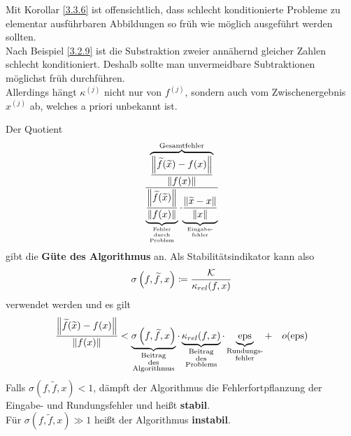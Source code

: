 \begin{Beme}
  Mit Korollar \ref{3.3.6} ist offensichtlich, dass schlecht konditionierte Probleme 
  zu elementar ausführbaren Abbildungen so früh wie möglich ausgeführt werden sollten. \\
  Nach Beispiel \ref{3.2.9} ist die Substraktion zweier annähernd gleicher Zahlen schlecht konditioniert.
  Deshalb sollte man unvermeidbare Subtraktionen möglichst früh durchführen. \\
  Allerdings hängt $\kappa^{(j)}$ nicht nur von $f^{(j)}$, sondern auch vom 
  Zwischenergebnis $x^{(j)}$ ab, welches a priori unbekannt ist.
\end{Beme}

\begin{Beme}[Sprechweise]\label{3.3.8}
  Der Quotient 
  \begin{gather}
    \frac{\overbrace{\frac{\left\| \widetilde{f}(\widetilde{x})-f(x) \right\|}{\left\| f(x) \right\|}}^{
        \text{Gesamtfehler}}}
    {\underbrace{\frac{\left\| \widetilde{f}(\widetilde{x}) \right\|}{\left\| f(x) \right\|}}_{
        \scriptsize\substack{
          \text{Fehler} \\
          \text{durch} \\
          \text{Problem}
        }}
      \cdot
      {\underbrace{\frac{\left\| \widetilde{x}-x \right\|}{\left\| x \right\|}}_{
          \scriptsize\substack{\text{Eingabe-} \\ \text{fehler}}}}}
    \label{III.3.6}
  \end{gather}
  gibt die \textbf{Güte des Algorithmus}  an.
  Als Stabilitätsindikator kann also 
  \begin{gather}
    \sigma\left(f, \widetilde{f}, x\right) \coloneqq \frac{\mathcal{K}}{\kappa_{rel}(f, x)}
    \label{III.3.7}
  \end{gather}
  verwendet werden und es gilt
  \begin{gather*}
    \frac{\left\| \widetilde{f}(\widetilde{x})-f(x) \right\|}{\left\| f(x) \right\|}
    < \underbrace{\sigma\left( f,\widetilde{f}, x\right) }_{
      \substack{\text{Beitrag}\\
        \text{des} \\
        \text{Algorithmus}}}
    \cdot \underbrace{\kappa_{rel}(f,x)}_{
      \substack{\text{Beitrag} \\
        \text{des} \\
        \text{Problems}}}
    \cdot \underbrace{\operatorname{eps}}_{\substack{\text{Rundungs-}\\\text{fehler}}}
    + \quad o(\operatorname{eps})
  \end{gather*}
  Falls $\sigma( f,\widetilde{f}, x)  < 1$, dämpft der Algorithmus die Fehlerfortpflanzung der Eingabe- und Rundungsfehler und heißt \textbf{stabil}. \\
  Für $\sigma( f,\widetilde{f}, x)  \gg 1$ heißt der Algorithmus \textbf{instabil}.
\end{Beme}



